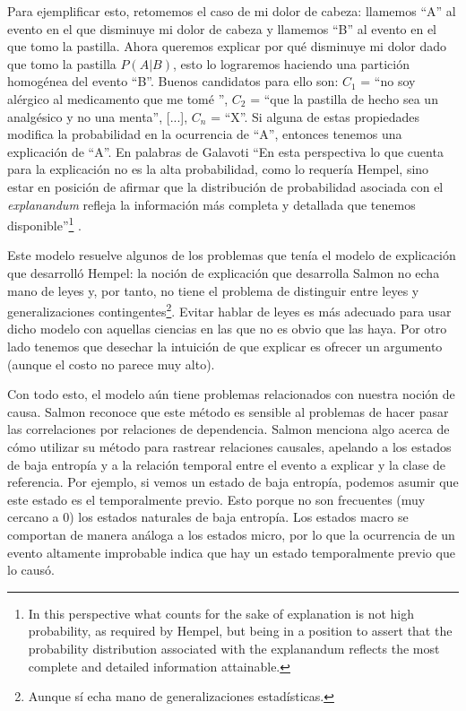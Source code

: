 Para ejemplificar esto, retomemos el caso de mi dolor de cabeza: llamemos ``A'' al evento en el que disminuye mi dolor de cabeza y llamemos ``B'' al evento en el que tomo la pastilla. Ahora queremos explicar por qué disminuye mi dolor dado que tomo la pastilla $P(A|B)$, esto lo lograremos haciendo una partición homogénea del evento ``B''. Buenos candidatos para ello son: $C_{1}$ = ``no soy alérgico al medicamento que me tomé '', $C_{2}$ = ``que la pastilla de hecho sea un analgésico y no una menta'', [...], $C_{n}$ = ``X''. Si alguna de estas propiedades modifica la probabilidad en la ocurrencia de ``A'', entonces tenemos una explicación de ``A''. En palabras de Galavoti ``En esta perspectiva lo que cuenta para la explicación no es la alta probabilidad, como lo requería Hempel, sino estar en posición de afirmar que la distribución de probabilidad asociada con el \textit{explanandum} refleja la información más completa y detallada que tenemos disponible''\footnote{In this perspective what counts for the sake of explanation is not high probability, as required by Hempel, but being in a position to assert that the probability distribution associated with the explanandum reflects the most complete and detailed information attainable.} \cite{Galavotti2018}.

Este modelo resuelve algunos de los problemas que tenía el modelo de explicación que desarrolló Hempel: la noción de explicación que desarrolla Salmon no echa mano de leyes y, por tanto, no tiene el problema de distinguir entre leyes y generalizaciones contingentes\footnote{Aunque sí echa mano de generalizaciones estadísticas.}. Evitar hablar de leyes es más adecuado para usar dicho modelo con aquellas ciencias en las que no es obvio que las haya. Por otro lado tenemos que desechar la intuición de que explicar es ofrecer un argumento (aunque el costo no parece muy alto).

Con todo esto, el modelo aún tiene problemas relacionados con nuestra noción de causa. Salmon reconoce que este método es sensible al problemas de hacer pasar las correlaciones por relaciones de dependencia. Salmon menciona algo acerca de cómo utilizar su método para rastrear relaciones causales, apelando a los estados de baja entropía y a la relación temporal entre el evento a explicar y la clase de referencia. Por ejemplo, si vemos un estado de baja entropía, podemos asumir que este estado es el temporalmente previo. Esto porque no son frecuentes (muy cercano a 0) los estados naturales de baja entropía. Los estados macro se comportan de manera análoga a los estados micro, por lo que la ocurrencia de un evento altamente improbable indica que hay un estado temporalmente previo que lo causó.

